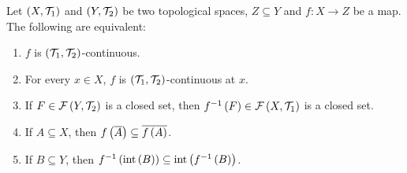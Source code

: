 \begin{proposition}
  Let $\left(X,\mathcal{T}_1\right)$ and $\left(Y,\mathcal{T}_2\right)$ be two topological spaces, $Z\subseteq Y$ and $f:X\rightarrow Z$ be a map. The following are equivalent:

  \begin{enumerate}
    \item $f$ is $\left(\mathcal{T}_1,\mathcal{T}_2\right)$-continuous.
    \item For every $x\in X$, $f$ is $\left(\mathcal{T}_1,\mathcal{T}_2\right)$-continuous at $x$.
    \item If $F\in\mathcal{F}\left(Y,\mathcal{T}_2\right)$ is a closed set, then $f^{-1}\left(F\right)\in\mathcal{F}\left(X,\mathcal{T}_1\right)$ is a closed set.
    \item If $A\subseteq X$, then $f\left(\overline{A}\right)\subseteq\overline{f\left(A\right)}$.
    \item If $B\subseteq Y$, then $f^{-1}\left(\operatorname{int}\left(B\right)\right)\subseteq\operatorname{int}\left(f^{-1}\left(B\right)\right)$.
  \end{enumerate}
  

\end{proposition}

